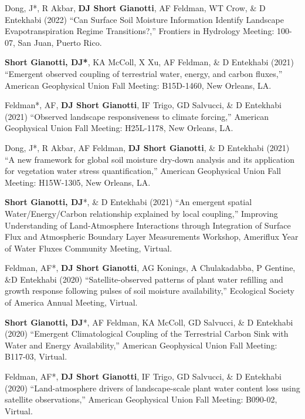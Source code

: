\documentclass[10pt, a4paper]{article}
\newcommand{\lbr}{\vspace*{12pt}}
\newcommand{\years}[1]{\mbox{}\marginnote{\scriptsize #1}} %
\begin{document}
\years{2022}Dong, J*, R Akbar, \textbf{DJ Short Gianotti}, AF Feldman, WT Crow, \& D Entekhabi (2022) ``Can Surface Soil Moisture Information Identify Landscape Evapotranspiration Regime Transitions?,'' Frontiers in Hydrology Meeting: 100-07, San Juan, Puerto Rico.\lbr
				
\years{2021}\textbf{Short Gianotti, DJ*}, KA McColl, X Xu, AF Feldman, \& D Entekhabi (2021) ``Emergent observed coupling of terrestrial water, energy, and 
carbon fluxes,'' American Geophysical Union Fall Meeting: B15D-1460, New Orleans, LA.\lbr %

\years{2021}Feldman*, AF, \textbf{DJ Short Gianotti}, IF Trigo, GD Salvucci, \& D Entekhabi (2021) ``Observed landscape responsiveness to climate forcing,'' 
American Geophysical Union Fall Meeting: H25L-1178, New Orleans, LA.\lbr %

\years{2021}Dong, J*, R Akbar, AF Feldman, \textbf{DJ Short Gianotti}, \& D Entekhabi (2021) ``A new framework for global soil moisture dry-down analysis 
and its application for vegetation water stress quantification,'' American Geophysical Union Fall Meeting: H15W-1305, New Orleans, LA.\lbr %
			
\years{2021}\textbf{Short Gianotti, DJ}*, \& D Entekhabi (2021) ``An emergent spatial Water/Energy/Carbon relationship explained by local coupling,'' Improving Understanding of Land-Atmosphere Interactions through Integration of Surface Flux and Atmospheric Boundary Layer Measurements Workshop, Ameriflux Year of Water Fluxes Community Meeting, Virtual.\lbr %

\years{2020}Feldman, AF*, \textbf{DJ Short Gianotti}, AG Konings, A Chulakadabba, P Gentine, \&D Entekhabi (2020) ``Satellite-observed patterns of plant water refilling and growth response following pulses of soil moisture availability,'' Ecological Society of America Annual Meeting, Virtual.\lbr %

\years{2020}\textbf{Short Gianotti, DJ}*, AF Feldman, KA McColl, GD Salvucci, \& D Entekhabi (2020) ``Emergent Climatological Coupling of the Terrestrial Carbon Sink with Water and Energy Availability,'' American Geophysical Union Fall Meeting: B117-03, Virtual.\lbr

\years{2020}Feldman, AF*, \textbf{DJ Short Gianotti}, IF Trigo, GD Salvucci, \& D Entekhabi (2020) ``Land-atmosphere drivers of landscape-scale plant water content loss using satellite observations,'' American Geophysical Union Fall Meeting: B090-02, Virtual.\lbr
\end{document}
